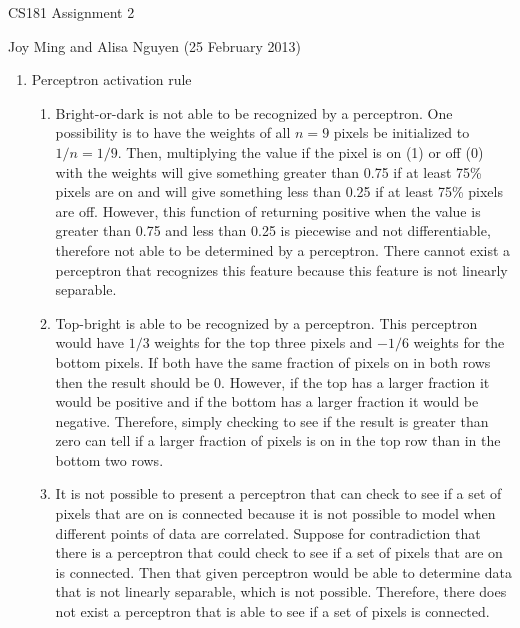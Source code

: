 \documentclass[11pt]{article}
\begin{document}
\begin{center}
\large
CS181 Assignment 2
\end{center}
Joy Ming and Alisa Nguyen (25 February 2013)\\

\begin{enumerate}
\setcounter{enumi}{0}

\item Perceptron activation rule
	\begin{enumerate}
	\item Bright-or-dark is not able to be recognized by a perceptron. One possibility is to have the weights of all $n=9$ pixels be initialized to $1/n=1/9$. Then, multiplying the value if the pixel is on (1) or off (0) with the weights will give something greater than 0.75 if at least 75\% pixels are on and will give something less than 0.25 if at least 75\% pixels are off. However, this function of returning positive when the value is greater than 0.75 and less than 0.25 is piecewise and not differentiable, therefore not able to be determined by a perceptron. There cannot exist a perceptron that recognizes this feature because this feature is not linearly separable.
	\item Top-bright is able to be recognized by a perceptron. This perceptron would have $1/3$ weights for the top three pixels and $-1/6$ weights for the bottom pixels. If both have the same fraction of pixels on in both rows then the result should be 0. However, if the top has a larger fraction it would be positive and if the bottom has a larger fraction it would be negative. Therefore, simply checking to see if the result is greater than zero can tell if a larger fraction of pixels is on in the top row than in the bottom two rows.
	\item It is not possible to present a perceptron that can check to see if a set of pixels that are on is connected because it is not possible to model when different points of data are correlated. Suppose for contradiction that there is a perceptron that could check to see if a set of pixels that are on is connected. Then that given perceptron would be able to determine data that is not linearly separable, which is not possible. Therefore, there does not exist a perceptron that is able to see if a set of pixels is connected.

\end{enumerate}
\end{enumerate}
\end{document}

